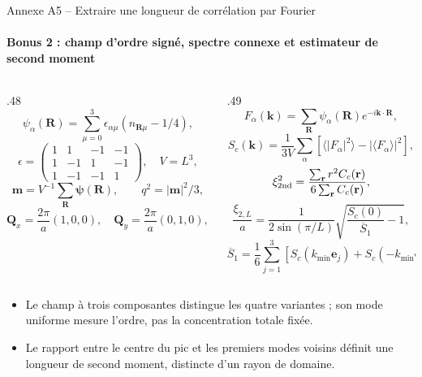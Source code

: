 \documentclass[aspectratio=169,10pt]{beamer}
\newcommand{\deuxpoints}[2]{\par\smallskip\begin{itemize}\setlength{\itemsep}{2pt}\setlength{\parskip}{0pt}\item #1\item #2\end{itemize}}
\begin{document}
\begin{frame}{Annexe A5 -- Extraire une longueur de corrélation par Fourier}
\framesubtitle{Bonus 2 : champ d'ordre signé, spectre connexe et estimateur de second moment}
\begin{columns}[T,onlytextwidth]
\begin{column}{.48\textwidth}
\[
\psi_\alpha(\mathbf R)=\sum_{\mu=0}^3\epsilon_{\alpha\mu}(n_{\mathbf R\mu}-1/4),
\]
\[
\epsilon=\begin{pmatrix}1&1&-1&-1\\1&-1&1&-1\\1&-1&-1&1\end{pmatrix},\quad V=L^3,
\]
\[
\mathbf m=V^{-1}\sum_{\mathbf R}\boldsymbol\psi(\mathbf R),\qquad q^2=|\mathbf m|^2/3,
\]
\[
\mathbf Q_x=\frac{2\pi}a(1,0,0),\quad\mathbf Q_y=\frac{2\pi}a(0,1,0),\quad\mathbf Q_z=\frac{2\pi}a(0,0,1).
\]
\end{column}
\begin{column}{.49\textwidth}
\[
F_\alpha(\mathbf k)=\sum_{\mathbf R}\psi_\alpha(\mathbf R)e^{-i\mathbf k\cdot\mathbf R},
\]
\[
S_c(\mathbf k)=\frac1{3V}\sum_\alpha\left[\langle|F_\alpha|^2\rangle-|\langle F_\alpha\rangle|^2\right],
\]
\[
\xi_{\rm 2nd}^2=\frac{\sum_{\mathbf r}r^2C_c(\mathbf r)}{6\sum_{\mathbf r}C_c(\mathbf r)},
\]
\[
\frac{\xi_{2,L}}a=\frac1{2\sin(\pi/L)}\sqrt{\frac{S_c(0)}{\overline S_1}-1},
\]
\[
\overline S_1=\frac16\sum_{j=1}^3\left[S_c(k_{\min}\mathbf e_j)+S_c(-k_{\min}\mathbf e_j)\right],\quad k_{\min}=\frac{2\pi}{La}.
\]
\end{column}
\end{columns}
\deuxpoints{Le champ à trois composantes distingue les quatre variantes ; son mode uniforme mesure l'ordre, pas la concentration totale fixée.}{Le rapport entre le centre du pic et les premiers modes voisins définit une longueur de second moment, distincte d'un rayon de domaine.}
\end{frame}
\end{document}
